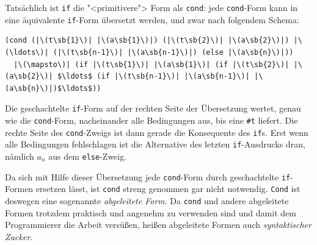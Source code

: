 Tatsächlich ist \lstinline{if} die "<primitivere"> Form als
\lstinline{cond}: jede \lstinline{cond}-Form kann in eine äquivalente
\lstinline{if}-Form übersetzt werden, und zwar nach
folgendem Schema:
%
\begin{lstlisting}
(cond (|\(t\sb{1}\)| |\(a\sb{1}\)|) (|\(t\sb{2}\)| |\(a\sb{2}\)|) |\(\ldots\)| (|\(t\sb{n-1}\)| |\(a\sb{n-1}\)|) (else |\(a\sb{n}\)|))
  |\(\mapsto\)| (if |\(t\sb{1}\)| |\(a\sb{1}\)| (if |\(t\sb{2}\)| |\(a\sb{2}\)| $\ldots$ (if |\(t\sb{n-1}\)| |\(a\sb{n-1}\)| |\(a\sb{n}\)|)$\ldots$))
\end{lstlisting}
%
Die geschachtelte \lstinline{if}-Form auf der rechten Seite der
Übersetzung wertet, genau wie die \lstinline{cond}-Form, nacheinander
alle Bedingungen aus, bis eine \lstinline{#t} liefert.  Die rechte Seite des
\lstinline{cond}-Zweigs ist dann gerade die Konsequente des \lstinline{if}s.
Erst wenn alle Bedingungen fehlschlagen ist die Alternative des letzten
\lstinline{if}-Ausdrucks dran, nämlich $a_n$ aus dem \lstinline{else}-Zweig.

Da sich mit Hilfe dieser Übersetzung jede \lstinline{cond}-Form durch
geschachtelte \lstinline{if}-Formen ersetzen lässt, ist \lstinline{cond}
streng genommen gar nicht notwendig.  \lstinline{Cond} ist deswegen eine
sogenannte \textit{abgeleitete Form}.  Da \lstinline{cond} und andere
abgeleitete Formen trotzdem praktisch und angenehm zu verwenden sind
und damit dem Programmierer die Arbeit versüßen,
heißen abgeleitete Formen auch \textit{syntaktischer
  Zucker}.

